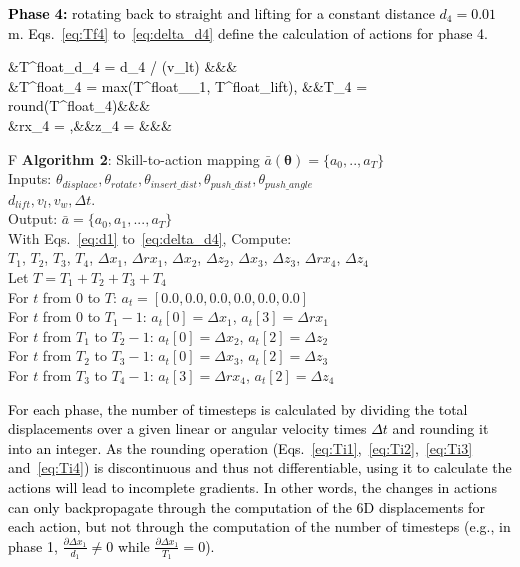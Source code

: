 \documentclass[letterpaper, 10 pt, journal, twoside]{ieeetran}
\newcommand{\rp}[1]{\textcolor{black}{#1}}
\begin{document}
\rp{\textbf{Phase 4:} rotating back to straight and lifting for a constant distance $d_4=0.01$ m. Eqs.~\ref{eq:Tf4} to~\ref{eq:delta_d4} define the calculation of actions for phase 4.}
\begingroup\makeatletter\def\f@size{8}\check@mathfonts\rp{\vspace{-0.3cm}
\begin{flalign}
    &T^{float}_{d_4} = d_4 / (v_l\cdot\Delta t) &&&\label{eq:Tf4}\\
    &T^{float}_4 = max(T^{float}_{\varphi_1}, T^{float}_{lift}), &&T_4 = round(T^{float}_4)&&&\label{eq:Ti4}\\
    &\Delta rx_4 = \frac{- \varphi_1}{T_4},&&\Delta z_4 = \frac{d_4}{T_4}&&&\label{eq:delta_d4}
\end{flalign}}
\endgroup

\begin{table}[t]
\small
\centering
\begin{tabular}{F}
\toprule
\textbf{Algorithm 2}: Skill-to-action mapping $\bar{a}(\pmb{\theta})=\{a_0,..,a_T\}$\\
\midrule
Inputs: $\theta_{ displace},\theta_{ rotate},\theta_{ insert\_dist},\theta_{ push\_dist},\theta_{ push\_angle}$\\
$d_{ lift}, v_l,v_w,\Delta t$. \\
Output: $\bar{a}=\{a_0,a_1,...,a_T\}$\\
\midrule
With Eqs.~\ref{eq:d1} to~\ref{eq:delta_d4}, Compute: \\
$T_1$, $T_2$, $T_3$, $T_4$, $\Delta x_1$, $\Delta rx_1$, $\Delta x_2$, $\Delta z_2$, $\Delta x_3$, $\Delta z_3$, $\Delta rx_4$, $\Delta z_4$\\
Let $T =T_1+T_2+T_3+T_4$\\
For $t$ from $0$ to $T$: \hspace{0.73cm} $a_t = [0.0, 0.0, 0.0, 0.0, 0.0, 0.0]$\\
For $t$ from $0$ to $T_1-1$: \hspace{0.07cm} $a_t[0] = \Delta x_1$, $a_t[3]=\Delta rx_1$\\
For $t$ from $T_1$ to $T_2-1$: $a_t[0] = \Delta x_2$, $a_t[2]=\Delta z_2$\\
For $t$ from $T_2$ to $T_3-1$: $a_t[0] = \Delta x_3$, $a_t[2]=\Delta z_3$\\
For $t$ from $T_3$ to $T_4-1$: $a_t[3] = \Delta rx_4$, $a_t[2]=\Delta z_4$\\
\bottomrule
\end{tabular}
\end{table}

\rp{For each phase, the number of timesteps is calculated by dividing the total displacements over a given linear or angular velocity times $\Delta t$ and rounding it into an integer. As the rounding operation (Eqs.~\ref{eq:Ti1},~\ref{eq:Ti2},~\ref{eq:Ti3} and~\ref{eq:Ti4}) is discontinuous and thus not differentiable, using it to calculate the actions will lead to incomplete gradients. In other words, the changes in actions can only backpropagate through the computation of the 6D displacements for each action, but not through the computation of the number of timesteps (e.g., in phase 1, $\frac{\partial\Delta x_1}{d_1}\neq0$ while $\frac{\partial\Delta x_1}{T_1}=0$).}
\end{document}

